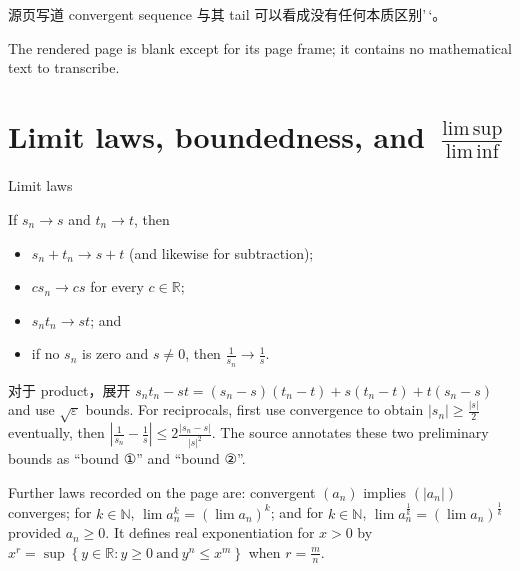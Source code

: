 源页写道 convergent sequence 与其 tail 可以看成没有任何本质区别'\,`。

The rendered page is blank except for its page frame; it contains no mathematical text to transcribe.

\section{\texorpdfstring{Limit laws, boundedness, and \(\frac{\operatorname{lim\, sup}}{\operatorname{lim\, inf}}\)}{Limit laws, boundedness, and \textbackslash frac\{\textbackslash operatorname\{lim\textbackslash, sup\}\}\{\textbackslash operatorname\{lim\textbackslash, inf\}\}}}

\begin{theorem}{Limit laws}

If \(s_{n}\rightarrow s\) and \(t_{n}\rightarrow t\), then

\begin{itemize}
\tightlist
\item
  \(s_{n} + t_{n}\rightarrow s + t\) (and likewise for subtraction);
\item
  \(cs_{n}\rightarrow cs\) for every \(c \in \mathbb{R}\);
\item
  \(s_{n}t_{n}\rightarrow st\); and
\item
  if no \(s_{n}\) is zero and \(s \neq 0\), then \(\frac{1}{s_{n}}\rightarrow\frac{1}{s}\).
\end{itemize}

\end{theorem}

对于 product，展开 \(s_{n}t_{n} - st = \left( {s_{n} - s} \right)\left( {t_{n} - t} \right) + s\left( {t_{n} - t} \right) + t\left( {s_{n} - s} \right)\) and use \(\sqrt{\varepsilon}\) bounds. For reciprocals, first use convergence to obtain \(\left| s_{n} \right| \geq \frac{|s|}{2}\) eventually, then \(\left| {\frac{1}{s_{n}} - \frac{1}{s}} \right| \leq 2\frac{\left| {s_{n} - s} \right|}{|s|^{2}}\). The source annotates these two preliminary bounds as ``bound ①'' and ``bound ②''.

Further laws recorded on the page are: convergent \(\left( a_{n} \right)\) implies \(\left( \left| a_{n} \right| \right)\) converges; for \(k \in \mathbb{N}\), \(\lim a_{n}^{k} = \left( {\lim a_{n}} \right)^{k}\); and for \(k \in \mathbb{N}\), \(\lim a_{n}^{\frac{1}{k}} = \left( {\lim a_{n}} \right)^{\frac{1}{k}}\) provided \(a_{n} \geq 0\). It defines real exponentiation for \(x > 0\) by \(x^{r} = \sup\left\{ {y \in \mathbb{R}:y \geq 0\ \text{and}\ y^{n} \leq x^{m}} \right\}\) when \(r = \frac{m}{n}\).

